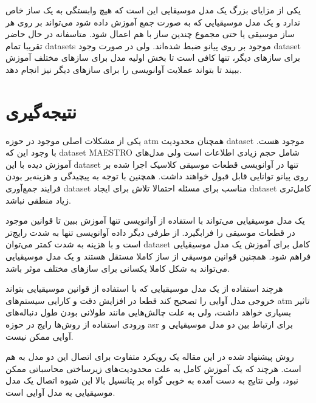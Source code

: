 یکی از مزایای بزرگ یک مدل موسیقایی این است که هیچ وابستگی به یک ساز خاص ندارد و
یک مدل موسیقیایی که به صورت جمع آموزش داده شود می‌تواند بر روی هر ساز موسیقی یا
حتی مجموع چندین ساز با هم اعمال شود. متاسفانه در حال حاضر تقریبا تمام
\glspl{dataset} موجود بر روی پیانو ضبط شده‌اند. ولی در صورت وجود \gls{dataset}
برای سازهای دیگر، تنها کافی است تا بخش اولیه مدل برای سازهای مختلف آموزش ببیند
تا بتواند عملایت آوانویسی را برای سازهای دیگر نیز انجام دهد.

\section{نتیجه‌گیری}
یکی از مشکلات اصلی موجود در حوزه \gls{atm} همچنان محدودیت \gls{dataset} موجود
هست. با وجود این که \gls{dataset} MAESTRO شامل حجم زیادی اطلاعات است ولی
مدل‌های آموزش دیده با این \gls{dataset} تنها در آوانویسی قطعات موسیقی کلاسیک
اجرا شده بر روی پیانو توانایی قابل قبول خواهند داشت. همچنین با توجه به پیچیدگی و
هزینه‌بر بودن فرایند جمع‌آوری \gls{dataset} مناسب برای مسئله احتمالا تلاش برای
ایجاد \gls{dataset} کامل‌تری زیاد منطقی نباشد.

یک مدل موسیقیایی می‌تواند با استفاده از آوانویسی تنها آموزش ببین تا قوانین موجود
در قطعات موسیقی را فرابگیرد. از طرفی دیگر داده آوانویسی تنها به شدت رایج‌تر است
و با هزینه‌ به شدت کمتر می‌توان \gls{dataset} کامل برای آموزش یک مدل موسیقیایی
فراهم شود. همچنین قوانین موسیقی از ساز کاملا مستقل هستند و یک مدل موسیقیایی
می‌تواند به شکل کاملا یکسانی برای سازهای مختلف موثر باشد.

هرچند استفاده از یک مدل موسیقیایی که با استفاده از قوانین موسیقیایی بتواند خروجی
مدل آوایی را تصحیح کند قطعا در افزایش دقت و کارایی سیستم‌های \gls{atm} تاثیر
بسیاری خواهد داشت، ولی به علت چالش‌هایی مانند طولانی بودن طول دنباله‌های ورودی
استفاده از روش‌ها رایج در حوزه \gls{asr} برای ارتباط بین دو مدل موسیقیایی و
آوایی ممکن نیست.

روش پیشنهاد شده در این مقاله یک رویکرد متفاوت برای اتصال این دو مدل به هم است.
هرچند که یک آموزش کامل به علت محدودیت‌های زیرساختی محاسباتی ممکن نبود، ولی نتایج
به دست آمده به خوبی گواه بر پتانسیل بالا این شیوه اتصال یک مدل موسیقیایی به مدل
آوایی است.